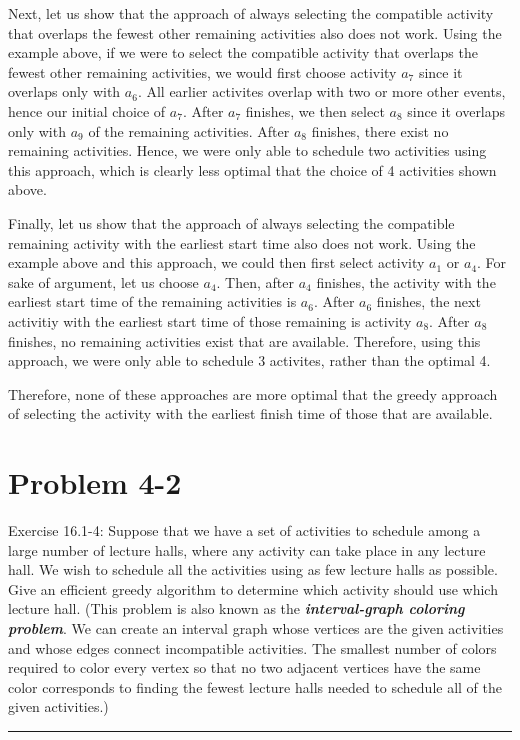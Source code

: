\documentclass[11pt]{article}
\def\separateline{\medskip\hrule\medskip}
\begin{document}
Next, let us show that the approach of always selecting the compatible activity that overlaps the fewest other remaining activities also does not work. Using the example above, if we were to select the compatible activity that overlaps the fewest other remaining activities, we would first choose activity $a_7$ since it overlaps only with $a_6$. All earlier activites overlap with two or more other events, hence our initial choice of $a_7$. After $a_7$ finishes, we then select $a_8$ since it overlaps only with $a_9$ of the remaining activities. After $a_8$ finishes, there exist no remaining activities. Hence, we were only able to schedule two activities using this approach, which is clearly less optimal that the choice of 4 activities shown above.

Finally, let us show that the approach of always selecting the compatible remaining activity with the earliest start time also does not work. Using the example above and this approach, we could then first select activity $a_1$ or $a_4$. For sake of argument, let us choose $a_4$. Then, after $a_4$ finishes, the activity with the earliest start time of the remaining activities is $a_6$. After $a_6$ finishes, the next activitiy with the earliest start time of those remaining is activity $a_8$. After $a_8$ finishes, no remaining activities exist that are available. Therefore, using this approach, we were only able to schedule 3 activites, rather than the optimal 4.

Therefore, none of these approaches are more optimal that the greedy approach of selecting the activity with the earliest finish time of those that are available.

\newpage

\section{Problem 4-2}
Exercise 16.1-4: Suppose that we have a set of activities to schedule among a large number of lecture halls, where any activity can take place in any lecture hall. We wish to schedule all the activities using as few lecture halls as possible. Give an efficient greedy algorithm to determine which activity should use which lecture hall.
(This problem is also known as the \textbf{\textit{interval-graph coloring problem}}. We can create an interval graph whose vertices are the given activities and whose edges connect incompatible activities. The smallest number of colors required to color every vertex so that no two adjacent vertices have the same color corresponds to finding the fewest lecture halls needed to schedule all of the given activities.)
\separateline
\end{document}
